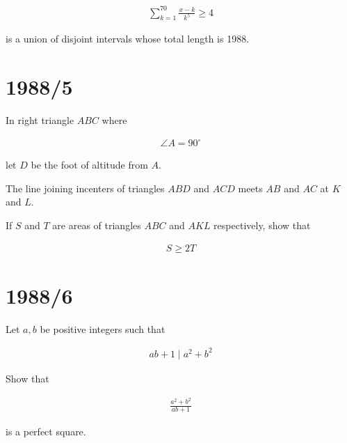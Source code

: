 \documentclass[12pt]{article}
\begin{document}
\begin{align*}
\sum_{k=1}^{70}\frac{x-k}{k^5}\geq4
\end{align*}

is a union of disjoint intervals whose total length is 1988.

\section*{1988/5}

In right triangle $ABC$ where

\begin{align*}
\angle A=90^\circ
\end{align*}

let $D$ be the foot of altitude from $A$.

The line joining incenters of triangles $ABD$ and $ACD$ meets $AB$ and $AC$ at $K$ and $L$.

If $S$ and $T$ are areas of triangles $ABC$ and $AKL$ respectively, show that

\begin{align*}
S\geq2T
\end{align*}

\section*{1988/6}

Let $a,b$ be positive integers such that

\begin{align*}
ab+1 \mid a^2+b^2
\end{align*}

Show that

\begin{align*}
\frac{a^2+b^2}{ab+1}
\end{align*}

is a perfect square.
\end{document}
